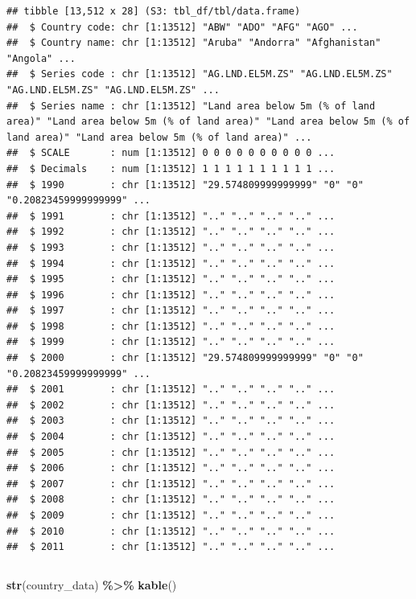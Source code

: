 \documentclass[
]{book}
\newenvironment{Shaded}{\begin{snugshade}}{\end{snugshade}}
\newcommand{\FunctionTok}[1]{\textcolor[rgb]{0.13,0.29,0.53}{\textbf{#1}}}
\newcommand{\NormalTok}[1]{#1}
\newcommand{\SpecialCharTok}[1]{\textcolor[rgb]{0.81,0.36,0.00}{\textbf{#1}}}
\begin{document}
\begin{verbatim}
## tibble [13,512 x 28] (S3: tbl_df/tbl/data.frame)
##  $ Country code: chr [1:13512] "ABW" "ADO" "AFG" "AGO" ...
##  $ Country name: chr [1:13512] "Aruba" "Andorra" "Afghanistan" "Angola" ...
##  $ Series code : chr [1:13512] "AG.LND.EL5M.ZS" "AG.LND.EL5M.ZS" "AG.LND.EL5M.ZS" "AG.LND.EL5M.ZS" ...
##  $ Series name : chr [1:13512] "Land area below 5m (% of land area)" "Land area below 5m (% of land area)" "Land area below 5m (% of land area)" "Land area below 5m (% of land area)" ...
##  $ SCALE       : num [1:13512] 0 0 0 0 0 0 0 0 0 0 ...
##  $ Decimals    : num [1:13512] 1 1 1 1 1 1 1 1 1 1 ...
##  $ 1990        : chr [1:13512] "29.574809999999999" "0" "0" "0.20823459999999999" ...
##  $ 1991        : chr [1:13512] ".." ".." ".." ".." ...
##  $ 1992        : chr [1:13512] ".." ".." ".." ".." ...
##  $ 1993        : chr [1:13512] ".." ".." ".." ".." ...
##  $ 1994        : chr [1:13512] ".." ".." ".." ".." ...
##  $ 1995        : chr [1:13512] ".." ".." ".." ".." ...
##  $ 1996        : chr [1:13512] ".." ".." ".." ".." ...
##  $ 1997        : chr [1:13512] ".." ".." ".." ".." ...
##  $ 1998        : chr [1:13512] ".." ".." ".." ".." ...
##  $ 1999        : chr [1:13512] ".." ".." ".." ".." ...
##  $ 2000        : chr [1:13512] "29.574809999999999" "0" "0" "0.20823459999999999" ...
##  $ 2001        : chr [1:13512] ".." ".." ".." ".." ...
##  $ 2002        : chr [1:13512] ".." ".." ".." ".." ...
##  $ 2003        : chr [1:13512] ".." ".." ".." ".." ...
##  $ 2004        : chr [1:13512] ".." ".." ".." ".." ...
##  $ 2005        : chr [1:13512] ".." ".." ".." ".." ...
##  $ 2006        : chr [1:13512] ".." ".." ".." ".." ...
##  $ 2007        : chr [1:13512] ".." ".." ".." ".." ...
##  $ 2008        : chr [1:13512] ".." ".." ".." ".." ...
##  $ 2009        : chr [1:13512] ".." ".." ".." ".." ...
##  $ 2010        : chr [1:13512] ".." ".." ".." ".." ...
##  $ 2011        : chr [1:13512] ".." ".." ".." ".." ...
\end{verbatim}

\begin{tabular}{}
\hline

\hline
\end{tabular}

\begin{Shaded}
\begin{Highlighting}[]
\FunctionTok{str}\NormalTok{(country\_data) }\SpecialCharTok{\%\textgreater{}\%} \FunctionTok{kable}\NormalTok{()}
\end{Highlighting}
\end{Shaded}
\end{document}
